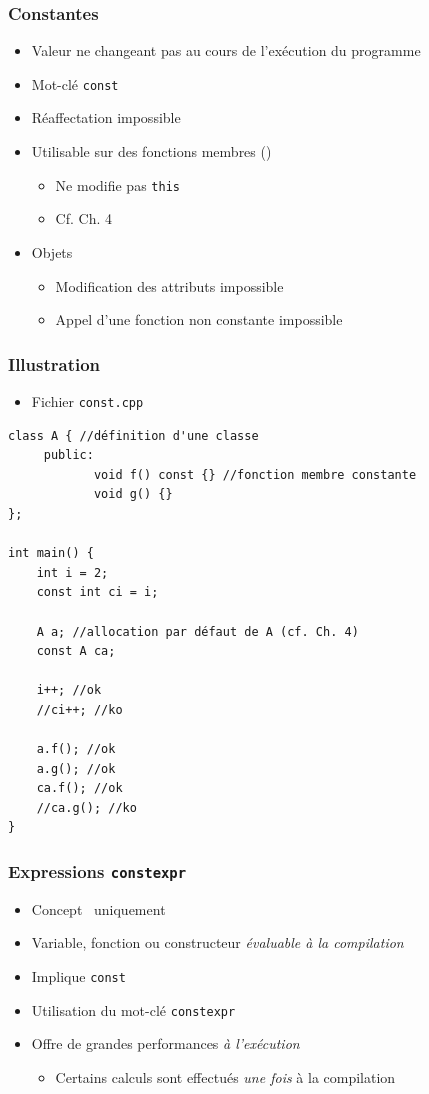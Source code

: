 \begin{frame}
\frametitle{Constantes}
\begin{itemize}[<+->]
\item Valeur ne changeant pas au cours de l'exécution du programme
\item Mot-clé \lstinline|const|
\item Réaffectation impossible
\item Utilisable sur des fonctions membres (\cpp)
	\begin{itemize}
	\item Ne modifie pas \lstinline|this|
	\item Cf. Ch. 4
	\end{itemize}
\item Objets
	\begin{itemize}
	\item Modification des attributs impossible
	\item Appel d'une fonction non constante impossible
	\end{itemize}
\end{itemize}
\end{frame}

\begin{frame}[containsverbatim]
\frametitle{Illustration}
\begin{itemize}
\item Fichier \texttt{const.cpp}
\end{itemize}
\begin{lstlisting}
class A { //définition d'une classe
     public:
            void f() const {} //fonction membre constante
            void g() {}
};

int main() {
    int i = 2;
    const int ci = i;
    
    A a; //allocation par défaut de A (cf. Ch. 4)
    const A ca;
    
    i++; //ok
    //ci++; //ko
    
    a.f(); //ok
    a.g(); //ok
    ca.f(); //ok
    //ca.g(); //ko
}
\end{lstlisting}
\end{frame}

\begin{frame}
\frametitle{Expressions \texttt{constexpr}}
\begin{itemize}[<+->]
\item Concept \cpp\ uniquement
\item Variable, fonction ou constructeur \emph{évaluable à la compilation}
\item Implique \lstinline|const| %
\item Utilisation du mot-clé \lstinline|constexpr|
\item Offre de grandes performances \emph{à l'exécution}
	\begin{itemize}
	\item Certains calculs sont effectués \emph{une fois} à la compilation
	\end{itemize}
\end{itemize}
\end{frame}

